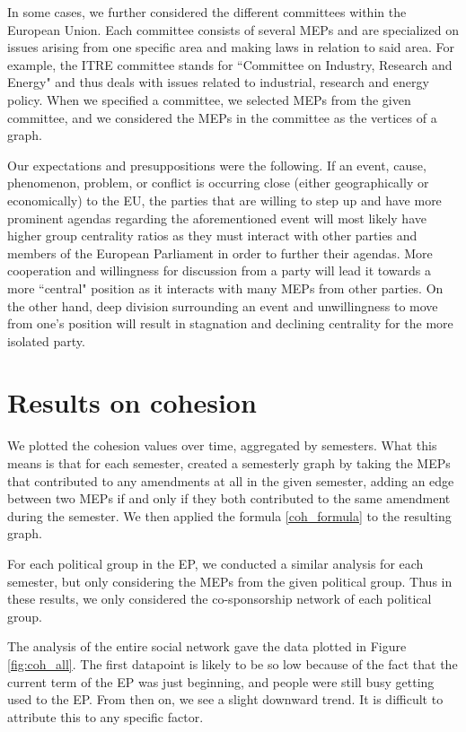 \documentclass[lettersize,journal]{IEEEtran}
\begin{document}
In some cases, we further considered the different committees within the European Union. Each committee consists of several MEPs and are specialized on issues arising from one specific area and making laws in relation to said area. For example, the ITRE committee stands for ``Committee on Industry, Research and Energy" and thus deals with issues related to industrial, research and energy policy. When we specified a committee, we selected MEPs from the given committee, and we considered the MEPs in the committee as the vertices of a graph.

Our expectations and presuppositions were the following. If an event, cause, phenomenon, problem, or conflict is occurring close (either geographically or economically) to the EU, the parties that are willing to step up and have more prominent agendas regarding the aforementioned event will most likely have higher group centrality ratios as they must interact with other parties and members of the European Parliament in order to further their agendas. More cooperation and willingness for discussion from a party will lead it towards a more ``central" position as it interacts with many MEPs from other parties. On the other hand, deep division surrounding an event and unwillingness to move from one's position will result in stagnation and declining centrality for the more isolated party.

\section{Results on cohesion} \label{sec:results_coh}

We plotted the cohesion values over time, aggregated by semesters. What this means is that for each semester, created a semesterly graph by taking the MEPs that contributed to any amendments at all in the given semester, adding an edge between two MEPs if and only if they both contributed to the same amendment during the semester. We then applied the formula \ref{coh_formula} to the resulting graph.

For each political group in the EP, we conducted a similar analysis for each semester, but only considering the MEPs from the given political group. Thus in these results, we only considered the co-sponsorship network of each political group.

The analysis of the entire social network gave the data plotted in Figure \ref{fig:coh_all}. The first datapoint is likely to be so low because of the fact that the current term of the EP was just beginning, and people were still busy getting used to the EP. From then on, we see a slight downward trend. It is difficult to attribute this to any specific factor.
\end{document}
